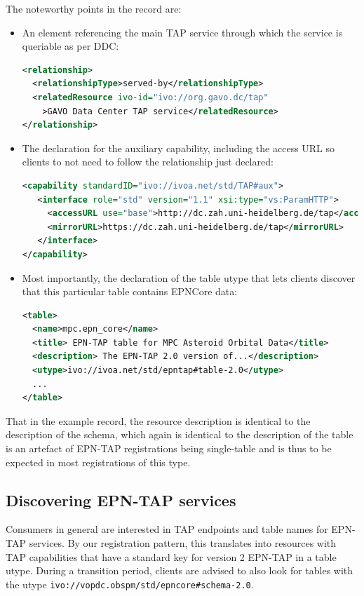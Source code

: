 \documentclass[11pt,a4paper]{ivoa}
\begin{document}
The noteworthy points in the record are:

\begin{itemize}
\item An  element referencing the main TAP service 
through which the service is queriable as per DDC:
\begin{lstlisting}[language=XML,basicstyle=\footnotesize]
<relationship>
  <relationshipType>served-by</relationshipType>
  <relatedResource ivo-id="ivo://org.gavo.dc/tap"
    >GAVO Data Center TAP service</relatedResource>
</relationship>
\end{lstlisting}

\item The declaration for the auxiliary capability, including the access
URL so clients to not need to follow the relationship just declared:
\begin{lstlisting}[language=XML,basicstyle=\footnotesize]
<capability standardID="ivo://ivoa.net/std/TAP#aux">
   <interface role="std" version="1.1" xsi:type="vs:ParamHTTP">
     <accessURL use="base">http://dc.zah.uni-heidelberg.de/tap</accessURL>
     <mirrorURL>https://dc.zah.uni-heidelberg.de/tap</mirrorURL>
   </interface>
</capability>
\end{lstlisting}

\item Most importantly, the declaration of the table utype that lets
clients discover that this particular table contains EPNCore data:
\begin{lstlisting}[language=XML,basicstyle=\footnotesize]
<table>
  <name>mpc.epn_core</name>
  <title> EPN-TAP table for MPC Asteroid Orbital Data</title>
  <description> The EPN-TAP 2.0 version of...</description>
  <utype>ivo://ivoa.net/std/epntap#table-2.0</utype>
  ...
</table>
\end{lstlisting}
\end{itemize}

That in the example record, the resource description is identical to the
description of the schema, which again is identical to the description
of the table is an artefact of EPN-TAP registrations being single-table
and is thus to be expected in most registrations of this type.

\subsection{Discovering EPN-TAP services}

Consumers in general are interested in TAP endpoints and table names for
EPN-TAP services.  By our registration pattern, this translates into
resources with TAP capabilities that have a standard key for version 2
EPN-TAP in a table utype.  During a transition period, clients are
advised to also look for tables with the utype
\verb|ivo://vopdc.obspm/std/epncore#schema-2.0|.
\end{document}
